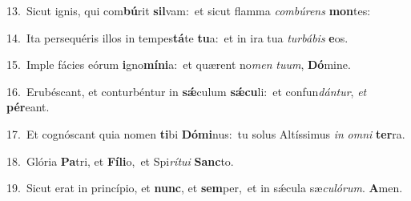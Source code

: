 {\numbfont\textcolor{\numbcolor}{13.}}~Sicut ignis, qui com\-\textbf{bú}\-rit \textbf{sil}\-vam:~\star et sicut flamma \textit{com}\-\textit{bú}\textit{rens} \textbf{mon}\-tes:\par
{\numbfont\textcolor{\numbcolor}{14.}}~Ita persequéris illos in tempes\-\textbf{tá}\-te \textbf{tu}\-a:~\star et in ira tua \textit{tur}\-\textit{bá}\textit{bis} \textbf{e}\-os.\par
{\numbfont\textcolor{\numbcolor}{15.}}~Imple fácies eórum \textbf{i}\-gno\-\textbf{mí}\-\textbf{ni}a:~\star et quærent no\textit{men} \textit{tu}\-\textit{um}, \textbf{Dó}\-mine.\par
{\numbfont\textcolor{\numbcolor}{16.}}~Erubéscant, et conturbéntur in \textbf{sǽ}\-culum \textbf{sǽ}\-\textbf{cu}li:~\star et confun\-\textit{dán}\-\textit{tur}, \textit{et} \textbf{pér}\-eant.\par
{\numbfont\textcolor{\numbcolor}{17.}}~Et cognóscant quia nomen \textbf{ti}\-bi \textbf{Dó}\-\textbf{mi}nus:~\star tu solus Altíssimus \textit{in} \textit{om}\-\textit{ni} \textbf{ter}\-ra.\par
{\numbfont\textcolor{\numbcolor}{18.}}~Glória \textbf{Pa}\-tri, et \textbf{Fí}\-\textbf{li}o,~\star et Spi\-\textit{rí}\-\textit{tu}\textit{i} \textbf{Sanc}\-to.\par
{\numbfont\textcolor{\numbcolor}{19.}}~Sicut erat in princípio, et \textbf{nunc}\-, et \textbf{sem}\-per,~\star et in sǽcula sæ\-\textit{cu}\-\textit{ló}\textit{rum}. \textbf{A}\-men.\par
